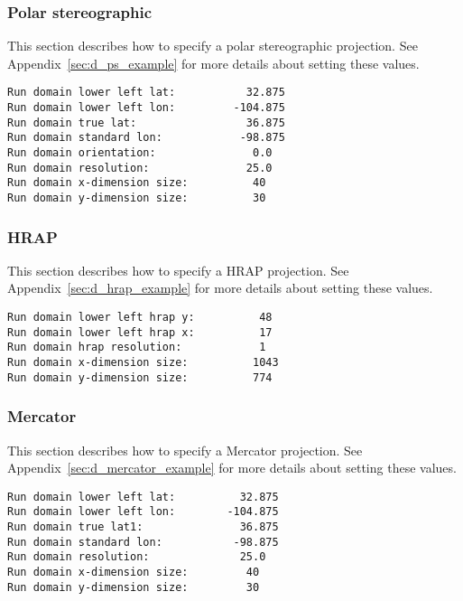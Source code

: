  
 \subsubsection{Polar stereographic} \label{sssec:run_ps}
 This section describes how to specify a polar stereographic
 projection.
 See Appendix~\ref{sec:d_ps_example} for more details about
 setting these values.
 

 \begin{Verbatim}[frame=single]
Run domain lower left lat:           32.875
Run domain lower left lon:         -104.875
Run domain true lat:                 36.875
Run domain standard lon:            -98.875
Run domain orientation:               0.0
Run domain resolution:               25.0
Run domain x-dimension size:          40
Run domain y-dimension size:          30
 \end{Verbatim}

 
 \subsubsection{HRAP} \label{sssec:run_hrap}
 This section describes how to specify a HRAP 
 projection.
 See Appendix~\ref{sec:d_hrap_example} for more details about
 setting these values.

 

 \begin{Verbatim}[frame=single]
Run domain lower left hrap y:          48
Run domain lower left hrap x:          17
Run domain hrap resolution:            1
Run domain x-dimension size:          1043
Run domain y-dimension size:          774
 \end{Verbatim}

 
 \subsubsection{Mercator} \label{sssec:run_mercator}
 This section describes how to specify a Mercator
 projection.
 See Appendix~\ref{sec:d_mercator_example} for more details about
 setting these values.
 

 \begin{Verbatim}[frame=single]
Run domain lower left lat:          32.875
Run domain lower left lon:        -104.875
Run domain true lat1:               36.875
Run domain standard lon:           -98.875
Run domain resolution:              25.0
Run domain x-dimension size:         40
Run domain y-dimension size:         30
 \end{Verbatim}

